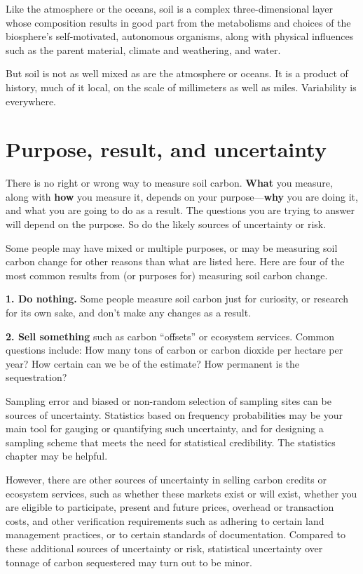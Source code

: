 \documentclass[11pt,letterpaper,oneside,onecolumn]{memoir}
\begin{document}
\noindent Like the atmosphere or the oceans, soil is a complex three-dimensional layer whose composition results in good part from the metabolisms and choices of the biosphere's self-motivated, autonomous organisms, along with physical influences such as the parent material, climate and weathering, and water.

But soil is not as well mixed as are the atmosphere or oceans. It is a product of history, much of it local, on the scale of millimeters as well as miles. Variability is everywhere.

\section{Purpose, result, and uncertainty}

There is no right or wrong way to measure soil carbon. \textbf{What} you measure, along with \textbf{how} you measure it, depends on your purpose---\textbf{why} you are doing it, and what you are going to do as a result. The questions you are trying to answer will depend on the purpose. So do the likely sources of uncertainty or risk.\label{purpose}

Some people may have mixed or multiple purposes, or may be measuring soil carbon change for other reasons than what are listed here. Here are four of the most common results from (or purposes for) measuring soil carbon change.

\textbf{1. Do nothing.} Some people measure soil carbon just for curiosity, or research for its own sake, and don't make any changes as a result.

\textbf{2. Sell something} such as carbon ``offsets'' or ecosystem services. Common questions include: How many tons of carbon or carbon dioxide per hectare per year? How certain can we be of the estimate? How permanent is the sequestration?

Sampling error and biased or non-random selection of sampling sites can be sources of uncertainty. Statistics based on frequency probabilities may be your main tool for gauging or quantifying such uncertainty, and for designing a sampling scheme that meets the need for statistical credibility. The statistics chapter may be helpful.

However, there are other sources of uncertainty in selling carbon credits or ecosystem services, such as whether these markets exist or will exist, whether you are eligible to participate, present and future prices, overhead or transaction costs, and other verification requirements such as adhering to certain land management practices, or to certain standards of documentation. Compared to these additional sources of uncertainty or risk, statistical uncertainty over tonnage of carbon sequestered may turn out to be minor.
\end{document}
